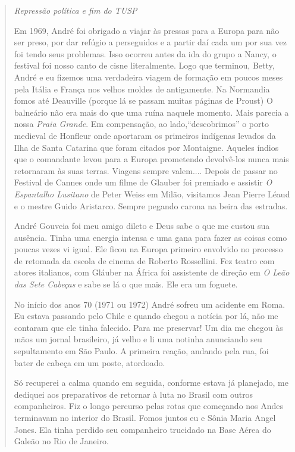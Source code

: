 \begin{quote}
\textit{Repressão política e fim do TUSP}

Em 1969, André foi obrigado a viajar às pressas para a Europa para não
ser preso, por dar refúgio a perseguidos e a partir daí cada um por sua
vez foi tendo seus problemas. Isso ocorreu antes da ida do grupo a
Nancy, o festival foi nosso canto de cisne literalmente. Logo que
terminou, Betty, André e eu fizemos uma verdadeira viagem de formação em
poucos meses pela Itália e França nos velhos moldes de antigamente. Na
Normandia fomos até Deauville (porque lá se passam muitas páginas de
Proust) O balneário não era mais do que uma ruína naquele momento. Mais
parecia a nossa \textit{Praia Grande}. Em compensação, ao
lado,“descobrimos” o porto medieval de Honfleur onde aportaram os
primeiros indígenas levados da Ilha de Santa Catarina que foram citados
por Montaigne. Aqueles índios que o comandante levou para a Europa
prometendo devolvê-los nunca mais retornaram às suas terras. Viagens
sempre valem.... Depois de passar no Festival de Cannes onde um filme de
Glauber foi premiado e assistir \textit{O Espantalho Lusitano} de Peter
Weiss em Milão, visitamos Jean Pierre Léaud e o mestre Guido Aristarco.
Sempre pegando carona na beira das estradas.

André Gouveia foi meu amigo dileto e Deus sabe o que me custou sua
ausência. Tinha uma energia intensa e uma gana para fazer as coisas como
poucas vezes vi igual. Ele ficou na Europa primeiro envolvido no
processo de retomada da escola de cinema de Roberto Rossellini. Fez
teatro com atores italianos, com Gláuber na África foi assistente de
direção em \textit{O Leão das Sete Cabeças} e sabe se lá o que mais. Ele
era um foguete.

No início dos anos 70 (1971 ou 1972) André sofreu um acidente em Roma.
Eu estava passando pelo Chile e quando chegou a notícia por lá, não me
contaram que ele tinha falecido. Para me preservar! Um dia me chegou às
mãos um jornal brasileiro, já velho e li uma notinha anunciando seu
sepultamento em São Paulo. A primeira reação, andando pela rua, foi
bater de cabeça em um poste, atordoado.

Só recuperei a calma quando em seguida, conforme estava já planejado, me
dediquei aos preparativos de retornar à luta no Brasil com outros
companheiros. Fiz o longo percurso pelas rotas que começando nos Andes
terminavam no interior do Brasil. Fomos juntos eu e Sônia Maria Angel
Jones. Ela tinha perdido seu companheiro trucidado na Base Aérea do
Galeão no Rio de Janeiro.


\end{quote}
